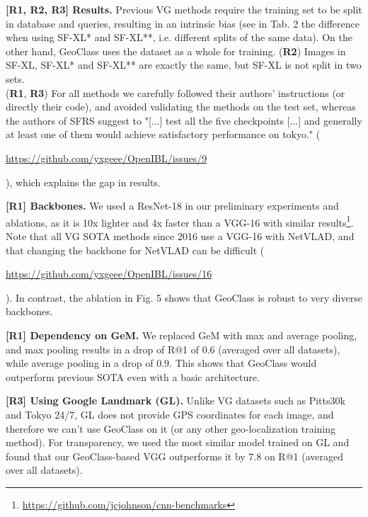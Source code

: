 \documentclass[10pt,twocolumn,letterpaper]{article}
\newcommand{\RI}{{\color{red}\textbf{R1}}}
\newcommand{\RII}{{\color{ForestGreen}\textbf{R2}}}
\newcommand{\RIII}{{\color{blue}\textbf{R3}}}
\newcommand{\myparagraph}[1]{\vspace{-0.5pt}\noindent\textbf{#1}}
\begin{document}
\myparagraph{[{\RI, \RII, \RIII}] Results.} 
Previous VG methods require the training set to be split in database and queries, resulting in an intrinsic bias (see in Tab. 2 the difference when using SF-XL* and SF-XL**, i.e. different splits of the same data).
On the other hand, GeoClass uses the dataset as a whole for training.
({\RII}) Images in SF-XL, SF-XL* and SF-XL** are exactly the same, but SF-XL is not split in two sets. \\
({\RI}, {\RIII}) For all methods we carefully followed their authors' instructions (or directly their code), and avoided validating the methods on the test set, whereas the authors of SFRS suggest to "[...] test all the five checkpoints [...] and generally at least one of them would achieve satisfactory performance on tokyo." (\begin{footnotesize}\url{https://github.com/yxgeee/OpenIBL/issues/9}\end{footnotesize}), which explains the gap in results.











\myparagraph{[{\RI}] Backbones.} 
We used a ResNet-18 in our preliminary experiments and ablations, as it is 10x lighter and 4x faster than a VGG-16 with similar results\footnote{\url{https://github.com/jcjohnson/cnn-benchmarks}}.
Note that all VG SOTA methods since 2016 use a VGG-16 with NetVLAD, and that changing the backbone for NetVLAD can be difficult (\begin{footnotesize}\url{https://github.com/yxgeee/OpenIBL/issues/16}\end{footnotesize}).
In contrast, the ablation in Fig. 5 shows that GeoClass is robust to very diverse backbones.



\myparagraph{[{\RI}] Dependency on GeM.} 
We replaced GeM with max and average pooling, and max pooling results in a drop of R@1 of 0.6 (averaged over all datasets), while average pooling in a drop of 0.9. This shows that GeoClass would outperform previous SOTA even with a basic architecture.



\myparagraph{[{\RIII}] Using Google Landmark (GL).} 
Unlike VG datasets such as Pitts30k and Tokyo 24/7, GL does not provide GPS coordinates for each image, and therefore we can't use GeoClass on it (or any other geo-localization training method).
For transparency, we used the most similar model trained on GL
and found that our GeoClass-based VGG outperforms it by 7.8 on R@1 (averaged over all datasets).
\end{document}
